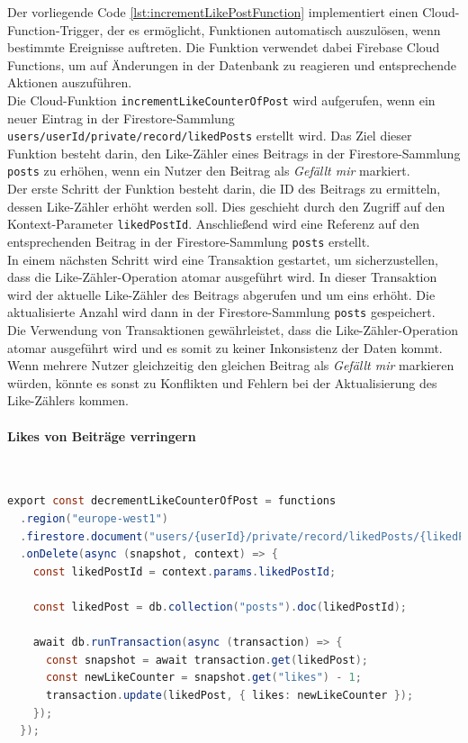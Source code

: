 Der vorliegende Code \ref{lst:incrementLikePostFunction} implementiert einen Cloud-Function-Trigger, der es ermöglicht, Funktionen automatisch auszulösen, wenn bestimmte Ereignisse auftreten. Die Funktion verwendet dabei Firebase Cloud Functions, um auf Änderungen in der Datenbank zu reagieren und entsprechende Aktionen auszuführen.
\\
Die Cloud-Funktion \texttt{incrementLikeCounterOfPost} wird aufgerufen, wenn ein neuer Eintrag in der Firestore-Sammlung \texttt{users/{userId}/private/record/likedPosts} erstellt wird. Das Ziel dieser Funktion besteht darin, den Like-Zähler eines Beitrags in der Firestore-Sammlung \texttt{posts} zu erhöhen, wenn ein Nutzer den Beitrag als \textit{Gefällt mir} markiert.
\\
Der erste Schritt der Funktion besteht darin, die ID des Beitrags zu ermitteln, dessen Like-Zähler erhöht werden soll. Dies geschieht durch den Zugriff auf den Kontext-Parameter \texttt{likedPostId}. Anschließend wird eine Referenz auf den entsprechenden Beitrag in der Firestore-Sammlung \texttt{posts} erstellt.
\\
In einem nächsten Schritt wird eine Transaktion gestartet, um sicherzustellen, dass die Like-Zähler-Operation atomar ausgeführt wird. In dieser Transaktion wird der aktuelle Like-Zähler des Beitrags abgerufen und um eins erhöht. Die aktualisierte Anzahl wird dann in der Firestore-Sammlung \texttt{posts} gespeichert.
\\
Die Verwendung von Transaktionen gewährleistet, dass die Like-Zähler-Operation atomar ausgeführt wird und es somit zu keiner Inkonsistenz der Daten kommt. Wenn mehrere Nutzer gleichzeitig den gleichen Beitrag als \textit{Gefällt mir} markieren würden, könnte es sonst zu Konflikten und Fehlern bei der Aktualisierung des Like-Zählers kommen.

\paragraph{Likes von Beiträge verringern}\mbox{} \\

\begin{lstlisting}[language=Java,caption=decrementLikeCounterOfPost Funktion,label=lst:decrementLikePostFunction]
  export const decrementLikeCounterOfPost = functions
  .region("europe-west1")
  .firestore.document("users/{userId}/private/record/likedPosts/{likedPostId}")
  .onDelete(async (snapshot, context) => {
    const likedPostId = context.params.likedPostId;

    const likedPost = db.collection("posts").doc(likedPostId);

    await db.runTransaction(async (transaction) => {
      const snapshot = await transaction.get(likedPost);
      const newLikeCounter = snapshot.get("likes") - 1;
      transaction.update(likedPost, { likes: newLikeCounter });
    });
  });
\end{lstlisting}

